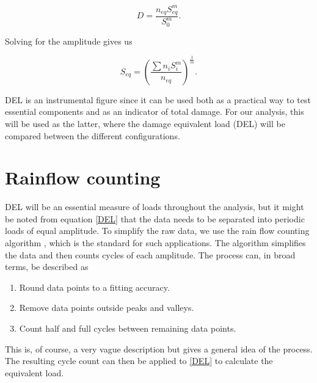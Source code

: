 \begin{equation}
D=\frac{n_{e q} S_{e q}^m}{S_0^m}.
\end{equation}

Solving for the amplitude gives us

\begin{equation}
S_{e q}=\left(\frac{\sum n_i S_i^m}{n_{e q}}\right)^{\frac{1}{m}}.
\label{DEL}
\end{equation}

DEL is an instrumental figure since it can be used both as a practical way to test essential components and as an indicator of total damage. For our analysis, this will be used as the latter, where the damage equivalent load (DEL) will be compared between the different configurations.


\section{Rainflow counting}

DEL will be an essential measure of loads throughout the analysis, but it might be noted from equation \ref{DEL} that the data needs to be separated into periodic loads of equal amplitude. To simplify the raw data, we use the rain flow counting algorithm \cite{rainflowref}, which is the standard for such applications. The algorithm simplifies the data and then counts cycles of each amplitude. The process can, in broad terms, be described as 

\begin{enumerate}

  \item Round data points to a fitting accuracy.

  \item Remove data points outside peaks and valleys.

  \item Count half and full cycles between remaining data points. 

\end{enumerate}

This is, of course, a very vague description but gives a general idea of the process. The resulting cycle count can then be applied to \ref{DEL} to calculate the equivalent load. 

